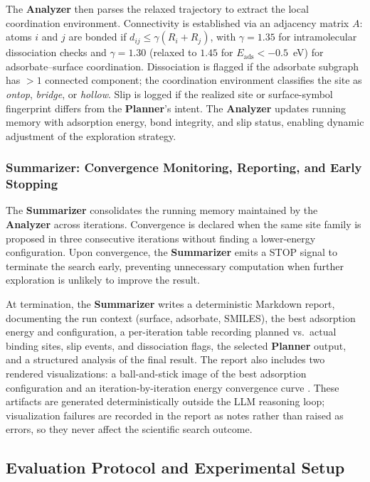 The \textbf{Analyzer} then parses the relaxed trajectory to extract the local coordination environment.
Connectivity is established via an adjacency matrix $A$: atoms $i$ and $j$ are bonded if $d_{ij} \le \gamma(R_i + R_j)$, with $\gamma=1.35$ for intramolecular dissociation checks and $\gamma=1.30$ (relaxed to $1.45$ for $E_{\text{ads}} < -0.5$~eV) for adsorbate--surface coordination.
Dissociation is flagged if the adsorbate subgraph has $>1$ connected component; the coordination environment classifies the site as \textit{ontop}, \textit{bridge}, or \textit{hollow}.
Slip is logged if the realized site or surface-symbol fingerprint differs from the \textbf{Planner}'s intent.
The \textbf{Analyzer} updates running memory with adsorption energy, bond integrity, and slip status, enabling dynamic adjustment of the exploration strategy.

\subsubsection{Summarizer: Convergence Monitoring, Reporting, and Early Stopping}

The \textbf{Summarizer} consolidates the running memory maintained by the \textbf{Analyzer} across iterations.
Convergence is declared when the same site family is proposed in three consecutive iterations without finding a lower-energy configuration.
Upon convergence, the \textbf{Summarizer} emits a STOP signal to terminate the search early, preventing unnecessary computation when further exploration is unlikely to improve the result.

At termination, the \textbf{Summarizer} writes a deterministic Markdown report, documenting the run context (surface, adsorbate, SMILES), the best adsorption energy and configuration, a per-iteration table recording planned vs.\ actual binding sites, slip events, and dissociation flags, the selected \textbf{Planner} output, and a structured analysis of the final result.
The report also includes two rendered visualizations: a ball-and-stick image of the best adsorption configuration and an iteration-by-iteration energy convergence curve .
These artifacts are generated deterministically outside the LLM reasoning loop; visualization failures are recorded in the report as notes rather than raised as errors, so they never affect the scientific search outcome.

\subsection{Evaluation Protocol and Experimental Setup}
\label{sec:eval_setup}

